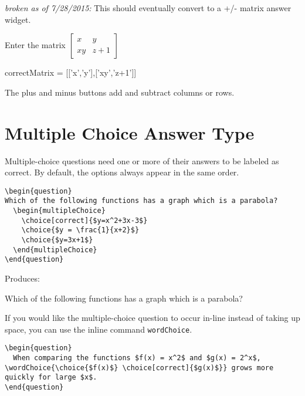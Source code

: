 \documentclass{ximera}
\begin{document}
\emph{broken as of 7/28/2015:} This should eventually convert to a +/- matrix answer widget.

\begin{question}
Enter the matrix  \(\begin{bmatrix} x & y \\ xy & z+1 \end{bmatrix}\)
\begin{matrixAnswer}
    correctMatrix = [['x','y'],['xy','z+1']]
\end{matrixAnswer}
\end{question}

\begin{remark}
  The plus and minus buttons add and subtract columns or rows.  
\end{remark}


\section{Multiple Choice Answer Type}

Multiple-choice questions need one or more of their answers to be labeled as correct. By default, the options always appear in the same order.

\begin{verbatim}
\begin{question}
Which of the following functions has a graph which is a parabola?
  \begin{multipleChoice}
    \choice[correct]{$y=x^2+3x-3$}
    \choice{$y = \frac{1}{x+2}$}
    \choice{$y=3x+1$}
  \end{multipleChoice}
\end{question}
\end{verbatim}

Produces:

\begin{question}
  Which of the following functions has a graph which is a parabola?
  \begin{multipleChoice}
  \end{multipleChoice}
\end{question}


If you would like the multiple-choice question to occur in-line instead of taking up space, you can use the inline command \verb!wordChoice!.
 
\begin{verbatim}
\begin{question}
  When comparing the functions $f(x) = x^2$ and $g(x) = 2^x$, \wordChoice{\choice{$f(x)$} \choice[correct]{$g(x)$}} grows more quickly for large $x$.
\end{question}
\end{verbatim}
\end{document}
